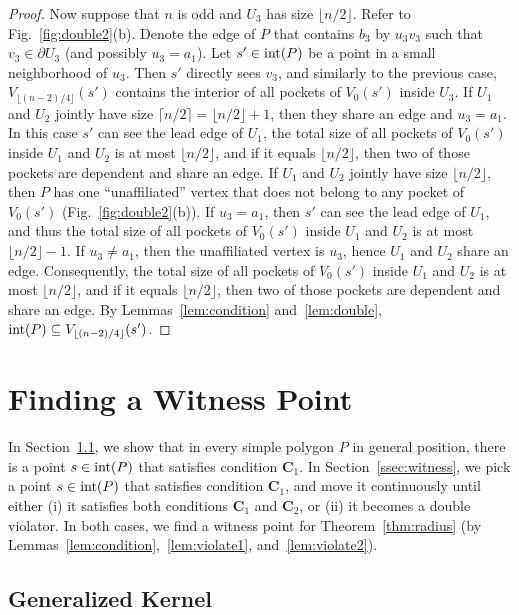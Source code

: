 \documentclass[12pt]{article}
\newcommand{\ceil}[1]{\lceil #1 \rceil}
\newcommand{\floor}[1]{{\lfloor #1 \rfloor}}
\begin{document}
\begin{proof}
Now suppose that $n$ is odd and $U_3$ has size $\floor{n/2}$. Refer to Fig.~\ref{fig:double2}(b).
Denote the edge of $P$ that contains $b_3$ by $u_3v_3$ such that $v_3\in \partial U_3$ (and possibly $u_3=a_1$).
Let $s'\in {\rm int}(P)$ be a point in a small neighborhood of $u_3$. Then $s'$ directly sees $v_3$,
and similarly to the previous case, $V_{\floor{(n-2)/4}}(s')$ contains the interior of all pockets of $V_0(s')$ inside $U_3$. If $U_1$ and $U_2$ jointly have size $\ceil{n/2}=\floor{n/2}+1$, then they share an edge and $u_3=a_1$.
In this case $s'$ can see the lead edge of $U_1$, the total size of all pockets of $V_0(s')$ inside $U_1$ and $U_2$ is at most $\floor{n/2}$, and if it equals $\floor{n/2}$, then two of those pockets are dependent and share an edge. If $U_1$ and $U_2$ jointly have size $\floor{n/2}$, then $P$ has one ``unaffiliated'' vertex that does not belong to any pocket of $V_0(s')$ (Fig.~\ref{fig:double2}(b)). If $u_3 = a_1$, then $s'$ can see the lead edge of $U_1$, and thus the total size of all pockets of $V_0(s')$ inside $U_1$ and $U_2$ is at most $\floor{n/2}-1$. If $u_3\neq a_1$, then the unaffiliated vertex is $u_3$, hence $U_1$ and $U_2$ share an edge. Consequently, the total size of all pockets of $V_0(s')$ inside $U_1$ and $U_2$ is at most $\floor{n/2}$, and if it equals $\floor{n/2}$, then two of those pockets are dependent and share an edge. By Lemmas~\ref{lem:condition} and~\ref{lem:double}, ${\rm int}(P)\subseteq V_{\floor{(n-2)/4}}(s')$.
\end{proof}

\section{Finding a Witness Point}
\label{sec:center}

In Section~\ref{ssec:kernel}, we show that in every simple polygon $P$ in general position, there is a point $s\in {\rm int}(P)$ that satisfies condition $\mathbf{C}_1$.
In Section~\ref{ssec:witness}, we pick a point $s\in {\rm int}(P)$ that satisfies condition $\mathbf{C}_1$, and move it continuously until either (i) it satisfies both conditions $\mathbf{C}_1$ and $\mathbf{C}_2$, or (ii) it becomes a double violator. In both cases, we find a witness point for Theorem~\ref{thm:radius} (by Lemmas~\ref{lem:condition},~\ref{lem:violate1}, and~\ref{lem:violate2}).

\subsection{Generalized Kernel}
\label{ssec:kernel}
\end{document}
